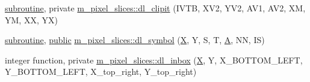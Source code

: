 \begin{DoxyCompactItemize}
\item 
\hyperlink{M__stopwatch_83_8txt_acfbcff50169d691ff02d4a123ed70482}{subroutine}, private \hyperlink{namespacem__pixel__slices_af0a3aeaa17e192568cb6a69a3b3eeab6}{m\+\_\+pixel\+\_\+slices\+::dl\+\_\+clipit} (I\+V\+TB, X\+V2, Y\+V2, A\+V1, A\+V2, XM, YM, XX, YX)
\item 
\hyperlink{M__stopwatch_83_8txt_acfbcff50169d691ff02d4a123ed70482}{subroutine}, \hyperlink{M__stopwatch_83_8txt_a2f74811300c361e53b430611a7d1769f}{public} \hyperlink{namespacem__pixel__slices_a2a40fc08575b18772b520c7b5b81a91e}{m\+\_\+pixel\+\_\+slices\+::dl\+\_\+symbol} (\hyperlink{intro__blas1_83_8txt_ac8596739bc875e90fe6e2ecf98e87906}{X}, Y, S, T, \hyperlink{ufpp__overview_81_8txt_a8341271e5f4e3003f6eb1c9547fc9d1a}{A}, NN, IS)
\item 
integer function, private \hyperlink{namespacem__pixel__slices_aa0de53a25754eab8fff1732aa2f93eba}{m\+\_\+pixel\+\_\+slices\+::dl\+\_\+inbox} (\hyperlink{intro__blas1_83_8txt_ac8596739bc875e90fe6e2ecf98e87906}{X}, Y, X\+\_\+\+B\+O\+T\+T\+O\+M\+\_\+\+L\+E\+FT, Y\+\_\+\+B\+O\+T\+T\+O\+M\+\_\+\+L\+E\+FT, X\+\_\+top\+\_\+right, Y\+\_\+top\+\_\+right)
\end{DoxyCompactItemize}

